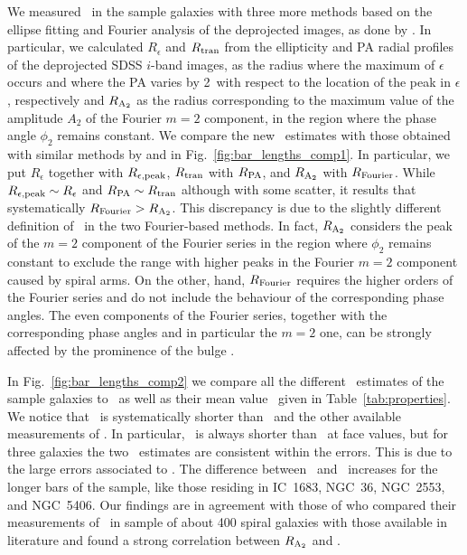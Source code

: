 \documentclass{aa}
\begin{document}
We measured \rbar\ in the sample galaxies with three more methods based on the ellipse fitting and Fourier analysis of the deprojected images, as done by \citet{Lee2019,Lee2020}. In particular, we calculated $R_\epsilon$ and $R_{\rm tran}$ from the ellipticity and PA radial profiles of the deprojected SDSS $i$-band images, as the radius where the maximum of $\epsilon$ occurs and where the PA varies by 2\degr\ with respect to the location of the peak in $\epsilon$, respectively and $R_{\rm A_2}$ as the radius corresponding to the maximum value of the amplitude $A_2$ of the Fourier $m=2$ component, in the region where the phase angle $\phi_2$ remains constant. We compare the new \rbar\ estimates with those obtained with similar methods by \cite{Aguerri2015} and \cite{Cuomo2019} in Fig.~\ref{fig:bar_lengths_comp1}. In particular, we put $R_\epsilon$ together with $R_{\rm \epsilon,peak}$, $R_{\rm tran}$ with $R_{\rm PA}$, and $R_{\rm A_2}$ with $R_{\rm Fourier}$. While $R_{\rm \epsilon,peak} \sim R_\epsilon$ and $R_{\rm PA} \sim R_{\rm tran}$ although with some scatter, it results that systematically $R_{\rm Fourier}>R_{\rm A_2}$. This discrepancy is due to the slightly different definition of \rbar\ in the two Fourier-based methods. In fact, $R_{\rm A_2}$ considers the peak of the $m=2$ component of the Fourier series in the region where $\phi_2$ remains constant to exclude the range with higher peaks in the Fourier $m=2$ component caused by spiral arms. On the other, hand, $R_{\rm Fourier}$ requires the higher orders of the Fourier series and do not include the behaviour of the corresponding phase angles. The even components of the Fourier series, together with the corresponding phase angles and in particular the $m=2$ one, can be strongly affected by the prominence of the bulge \citep{Debattista2002,Lee2020}.

In Fig.~\ref{fig:bar_lengths_comp2} we compare all the different \rbar\ estimates of the sample galaxies to \rqb\ as well as their mean value \rmean\ given in Table~\ref{tab:properties}. We notice that \rqb\ is systematically shorter than \rmean\ and the other available measurements of \rbar. In particular, \rqb\ is always shorter than \rmean\ at face values, but for three galaxies the two \rbar\ estimates are consistent within the errors. This is due to the large errors associated to \rmean. The difference between \rmean\ and \rqb\ increases for the longer bars of the sample, like those residing in IC~1683, NGC~36, NGC~2553, and NGC~5406. Our findings are in agreement with those of \citet{Lee2020} who compared their measurements of \rbar\ in sample of about 400 spiral galaxies with those available in literature \citep{Laurikainen2002, DiazGarcia2016} and found a strong correlation between $R_{\rm A_2}$ and \rqb. 
\end{document}
